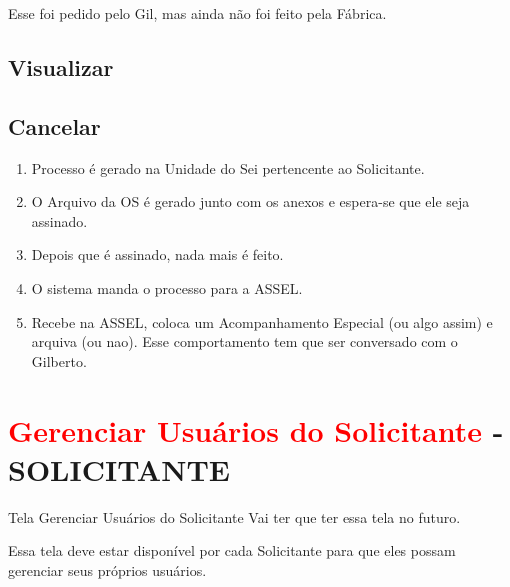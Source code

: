 	Esse foi pedido pelo Gil, mas ainda não foi feito pela Fábrica.
	
	\subsection{Visualizar}
	\subsection{Cancelar}
	
	
	
	
	
	\begin{enumerate}
		\item Processo é gerado na Unidade do Sei pertencente ao Solicitante.
	
		\item 	O Arquivo da OS é gerado junto com os anexos e espera-se que ele seja assinado.
		
		\item 	Depois que é assinado, nada mais é feito.
		
		\item 	O sistema manda o processo para a ASSEL.
		
		\item 	Recebe na ASSEL, coloca um Acompanhamento Especial (ou algo assim) e arquiva (ou nao). Esse comportamento tem que ser conversado com o Gilberto.	


	\end{enumerate}
	

	
		
	
	
	
\section{\textcolor{red}{Gerenciar Usuários do Solicitante} \msrlv - SOLICITANTE}

\begin{funcionalidade}{Tela Gerenciar Usuários do Solicitante}
	Vai ter que ter essa tela no futuro.
\end{funcionalidade}

Essa tela deve estar disponível por cada Solicitante para que eles possam gerenciar seus próprios usuários.



